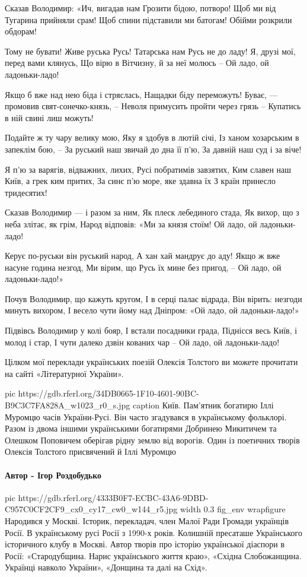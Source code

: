 \begin{multicols}{2}
        \obeycr
Сказав Володимир: «Ич, вигадав нам
Грозити бідою, потворо!
Щоб ми від Тугарина прийняли срам!
Щоб спини підставили ми батогам!
Обійми розкрили обдорам!

Тому не бувати! Живе руська Русь!
Татарська нам Русь не до ладу!
Я, друзі мої, перед вами клянусь,
Що вірю в Вітчизну, й за неї молюсь –
Ой ладо, ой ладоньки-ладо!

Якщо б вже над нею біда і стряслась,
Нащадки біду переможуть!
Буває, --- промовив свят-сонечко-князь, –
Неволя примусить пройти через грязь –
Купатись в ній свині лиш можуть!

Подайте ж ту чару велику мою,
Яку я здобув в лютій січі,
Із ханом хозарським в запеклім бою, –
За руський наш звичай до дна її п’ю,
За давній наш суд і за віче!

Я п’ю за варягів, відважних, лихих,
Русі побратимів завзятих,
Ким славен наш Київ, а грек ким притих,
За синє п’ю море, яке здавна їх
З країн принесло тридесятих!

Сказав Володимир --- і разом за ним,
Як плеск лебединого стада,
Як вихор, що з неба злітає, як грім,
Народ відповів: «Ми за князя стоїм!
Ой ладо, ой ладоньки-ладо!

Керує по-руськи він руський народ,
А хан хай мандрує до аду!
Якщо ж вже насуне година незгод,
Ми вірим, що Русь їх мине без пригод, –
Ой ладо, ой ладоньки-ладо!»

Почув Володимир, що кажуть кругом,
І в серці палає відрада,
Він вірить: незгоди минуть вихором,
І весело чути йому над Дніпром:
«Ой ладо, ой ладоньки-ладо!»

Підвівсь Володимир у колі бояр,
І встали посадники града,
Піднісся весь Київ, і молод і стар,
І чути далеко дзвін кованих чар –
Ой ладо, ой ладоньки-ладо!
        \restorecr
\end{multicols}

Цілком мої переклади українських поезій Олексія Толстого ви можете прочитати на
сайті «Літературної України».

\ifcmt
pic https://gdb.rferl.org/34DB0665-1F10-4601-90BC-B9C3C7FA828A_w1023_r0_s.jpg
caption Київ. Пам'ятник богатирю Іллі Муромцю часів України-Русі. Він часто згадувався в українському фольклорі. Разом із двома іншими українськими богатирями Добринею Микитичем та Олешком Поповичем оберігав рідну землю від ворогів. Один із поетичних творів Олексія Толстого присвячений й Іллі Муромцю
\fi

\paragraph{Автор - Ігор Роздобудько}


\ifcmt
pic https://gdb.rferl.org/4333B0F7-ECBC-43A6-9DBD-C957C0CF2CF9_cx0_cy17_cw0_w144_r5.jpg
width 0.3
fig_env wrapfigure
\fi
Народився у Москві. Історик, перекладач, член Малої Ради Громади українців
Росії. В українському русі Росії з 1990-х років. Колишній пресаташе
Українського історичного клубу в Москві. Автор творів про історію
української діаспори в Росії: «Стародубщина. Нарис українського життя
краю», «Східна Слобожанщина. Українці навколо України», «Донщина та
далі на Схід». 
